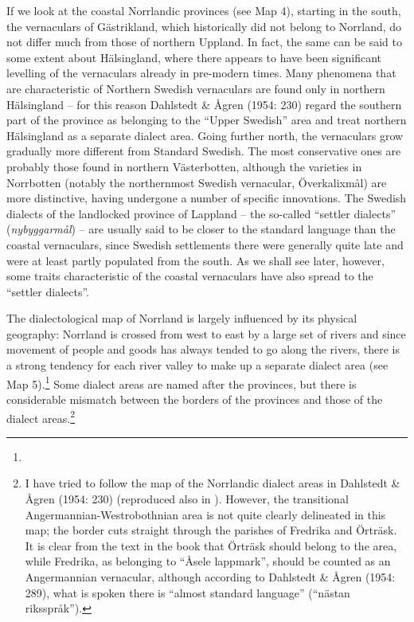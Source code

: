 If we look at the coastal Norrlandic provinces (see Map 4), starting in the south, the vernaculars of Gästrikland, which historically did not belong to Norrland, do not differ much from those of northern Uppland. In fact, the same can be said to some extent about Hälsingland, where there appears to have been significant levelling of the vernaculars already in pre-modern times. Many phenomena that are characteristic of Northern Swedish vernaculars are found only in northern Hälsingland – for this reason Dahlstedt \& Ågren (1954: 230) regard the southern part of the province as belonging to the “Upper Swedish” area and treat northern Hälsingland as a separate dialect area. Going further north, the vernaculars grow gradually more different from Standard Swedish. The most conservative ones are probably those found in northern Västerbotten, although the varieties in Norrbotten (notably the northernmost Swedish vernacular, Överkalixmål) are more distinctive, having undergone a number of specific innovations. The Swedish dialects of the landlocked province of Lappland – the so-called “settler dialects” (\textit{nybyggarmål}) – are usually said to be closer to the standard language than the coastal vernaculars, since Swedish settlements there were generally quite late and were at least partly populated from the south. As we shall see later, however, some traits characteristic of the coastal vernaculars have also spread to the “settler dialects”. 


The dialectological map of Norrland is largely influenced by its physical geography: Norrland is crossed from west to east by a large set of rivers and since movement of people and goods has always tended to go along the rivers, there is a strong tendency for each river valley to make up a separate dialect area (see Map 5).\footnote{ } Some dialect areas are named after the provinces, but there is considerable mismatch between the borders of the provinces and those of the dialect areas.\footnote{ I have tried to follow the map of the Norrlandic dialect areas in Dahlstedt \& Ågren (1954: 230) (reproduced also in \citet{Dahlstedt1971}). However, the transitional Angermannian-Westrobothnian area is not quite clearly delineated in this map; the border cuts straight through the parishes of Fredrika and Örträsk. It is clear from the text in the book that Örträsk should belong to the area, while Fredrika, as belonging to “Åsele lappmark”, should be counted as an Angermannian vernacular, although according to Dahlstedt \& Ågren (1954: 289), what is spoken there is “almost standard language” (“nästan riksspråk”). } 

